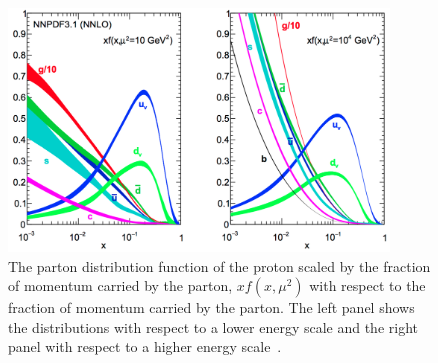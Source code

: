 \begin{figure}[htpb]
	\centering
	\includegraphics[width=0.9\textwidth]{Figures/PDF}
	\caption[The parton distribution function of the proton scaled by the fraction of momentum carried by the parton, $xf(x, \mu^2)$ with respect to the fraction of momentum carried by the parton. The left panel shows the distributions with respect to a lower energy scale and the right panel with respect to a higher energy scale.]{ The parton distribution function of the proton scaled by the fraction of momentum carried by the parton, $xf(x, \mu^2)$ with respect to the fraction of momentum carried by the parton. The left panel shows the distributions with respect to a lower energy scale and the right panel with respect to a higher energy scale~\cite{NNPDF3p1}. }
	\label{fig:pdf}
\end{figure}


